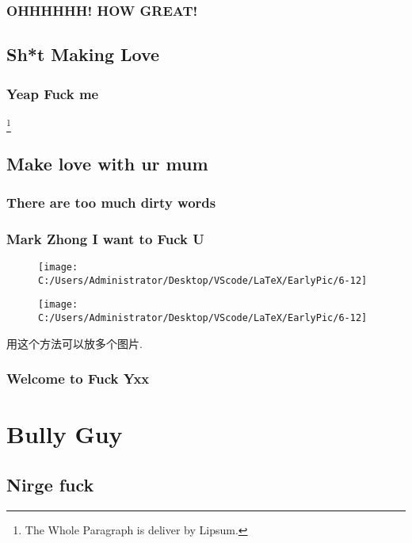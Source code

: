 \documentclass[12pt,a4paper]{article}
\begin{document}
	\lipsum[1-2]
	\subsubsection{OHHHHHH! HOW GREAT!}
	\begin{multicols}{2}
	\lipsum[66-70]
	\end{multicols}
	\subsection{Sh*t Making Love}
	\subsubsection{Yeap Fuck me}
	\lipsum[6-7]\footnote{The Whole Paragraph is deliver by Lipsum.}
	\subsection{Make love with ur mum}
	\subsubsection{There are too much dirty words}
	\lipsum[1-4]
	\subsubsection{Mark Zhong I want to Fuck U}
	\lipsum[2-3]
		\begin{figure}[H]
		\begin{minipage}{0.45\textwidth}
			\centering
			\texttt{[image: C:/Users/Administrator/Desktop/VScode/LaTeX/EarlyPic/6-12]}
			\caption*{}
		\end{minipage}
		\hfill
		\begin{minipage}{0.45\textwidth}
			\centering
			\texttt{[image: C:/Users/Administrator/Desktop/VScode/LaTeX/EarlyPic/6-12]}
			\caption*{}
		\end{minipage}
		\end{figure}
		用这个方法可以放多个图片.
	\subsubsection{Welcome to Fuck Yxx}
	\lipsum[99]
			
	\section{Bully Guy}
	\subsection{Nirge fuck}
\end{document}
